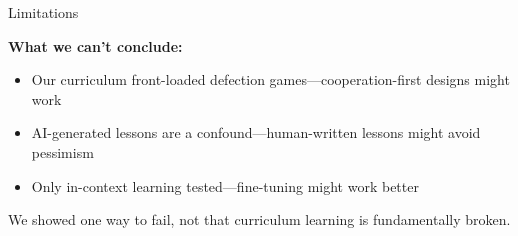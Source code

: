 \documentclass[aspectratio=169]{beamer}
\begin{document}


\begin{frame}{Limitations}
  
  \textbf{What we can't conclude:}
  \begin{itemize}
    \item Our curriculum front-loaded defection games---cooperation-first designs might work
    \item AI-generated lessons are a confound---human-written lessons might avoid pessimism
    \item Only in-context learning tested---fine-tuning might work better
  \end{itemize}
  
  \vspace{1em}
  We showed one way to fail, not that curriculum learning is fundamentally broken.

\end{frame}


\end{document}
